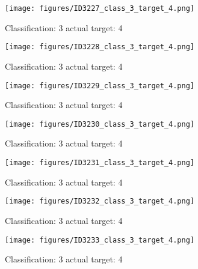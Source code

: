 \begin{figure}[h!]
\begin{center}
\texttt{[image: figures/ID3227\_class\_3\_target\_4.png]}
\end{center}
\caption{ Classification: 3 actual target: 4}
\label{fig:ID3227_class_3_target_4}
\end{figure}
\begin{figure}[h!]
\begin{center}
\texttt{[image: figures/ID3228\_class\_3\_target\_4.png]}
\end{center}
\caption{ Classification: 3 actual target: 4}
\label{fig:ID3228_class_3_target_4}
\end{figure}
\begin{figure}[h!]
\begin{center}
\texttt{[image: figures/ID3229\_class\_3\_target\_4.png]}
\end{center}
\caption{ Classification: 3 actual target: 4}
\label{fig:ID3229_class_3_target_4}
\end{figure}
\begin{figure}[h!]
\begin{center}
\texttt{[image: figures/ID3230\_class\_3\_target\_4.png]}
\end{center}
\caption{ Classification: 3 actual target: 4}
\label{fig:ID3230_class_3_target_4}
\end{figure}
\begin{figure}[h!]
\begin{center}
\texttt{[image: figures/ID3231\_class\_3\_target\_4.png]}
\end{center}
\caption{ Classification: 3 actual target: 4}
\label{fig:ID3231_class_3_target_4}
\end{figure}
\begin{figure}[h!]
\begin{center}
\texttt{[image: figures/ID3232\_class\_3\_target\_4.png]}
\end{center}
\caption{ Classification: 3 actual target: 4}
\label{fig:ID3232_class_3_target_4}
\end{figure}
\begin{figure}[h!]
\begin{center}
\texttt{[image: figures/ID3233\_class\_3\_target\_4.png]}
\end{center}
\caption{ Classification: 3 actual target: 4}
\label{fig:ID3233_class_3_target_4}
\end{figure}
